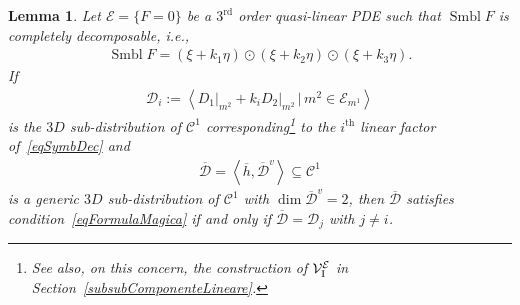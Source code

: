 \documentclass[pdftex]{sigma}
\newcommand{\C}{\mathcal{C}}
\newcommand{\D}{\mathcal{D}}
\newcommand{\MM}{\mathcal{V}_{\textrm{\normalfont I}}}
\newcommand{\E}{\mathcal{E}}
\newcommand{\Span}[1]{\left\langle #1 \right\rangle}
\newcommand{\Th}{^\textrm{th}}
\newcommand{\Rd}{^\textrm{rd}}
\numberwithin{equation}{section}
\newtheorem{Lemma}[Theorem]{Lemma}
\begin{document}
\begin{Lemma}\label{LemmaCalcolosoByGiovanni}
 Let $\E=\{F=0\}$ be a $3\Rd$ order quasi-linear PDE such that $\operatorname{Smbl} F$ is completely decomposable, i.e.,
 \begin{gather}\label{eqSymbDec}
\operatorname{Smbl} F=(\xi+k_1\eta)\odot(\xi+k_2\eta)\odot(\xi+k_3\eta).
\end{gather}
If
 \begin{gather}\label{eqDi}
\D_i:=\Span{\left. D_1\right|_{m^2}+k_i\left. D_2\right|_{m^2}\,|\, m^2\in \E_{m^1}}
\end{gather}
is the $3D$ sub-distribution of $\C^1$ corresponding\footnote{See also, on this concern, the construction of $\MM^\E$ in Section~\ref{subsubComponenteLineare}.} to the $i\Th$ linear factor of~\eqref{eqSymbDec} and
\begin{gather}\label{eqDiPrimo}
\overline{\D}=\Span{\overline{h},\overline{\D}^v}\subseteq\C^1
\end{gather}
is a generic $3D$ sub-distribution of $\C^1$ with $\dim \overline{\D}^v=2$, then $\overline{\D} $
 satisfies condition~\eqref{eqFormulaMagica} if and only if $\overline{\D}=\D_j$ with $j\neq i$.
\end{Lemma}
\end{document}
